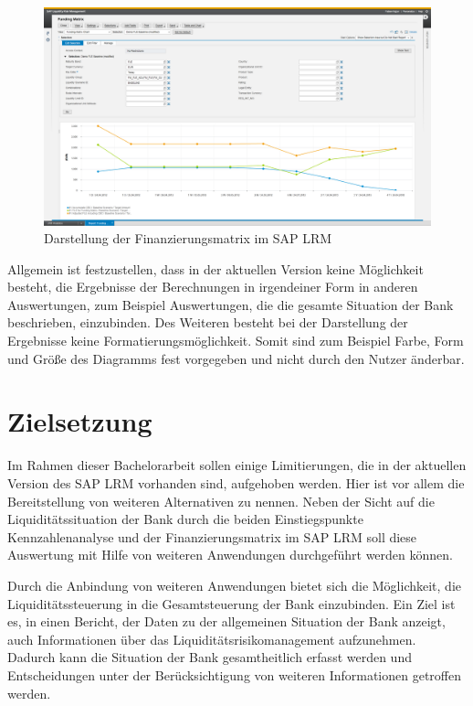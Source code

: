 \begin{onehalfspacing}
\begin{figure}[!ht]
\centering
\setlength{\unitlength}{1mm}
\includegraphics[width=15cm]{images/Funding_Matrix_Example.png}
\caption{Darstellung der Finanzierungsmatrix im SAP LRM\label{fig:lrm_istzustand_fundingmatrix}}
\end{figure} 

Allgemein ist festzustellen, dass in der aktuellen Version keine Möglichkeit besteht, die Ergebnisse der Berechnungen in irgendeiner Form in anderen Auswertungen, zum Beispiel Auswertungen, die die gesamte Situation der Bank beschrieben, einzubinden. Des Weiteren besteht bei der Darstellung der Ergebnisse keine Formatierungsmöglichkeit. Somit sind zum Beispiel Farbe, Form und Größe des Diagramms fest vorgegeben und nicht durch den Nutzer änderbar.

\section{Zielsetzung}
\label{sec:zielsetzung}

Im Rahmen dieser Bachelorarbeit sollen einige Limitierungen, die in der aktuellen Version des SAP LRM vorhanden sind, aufgehoben werden. Hier ist vor allem die Bereitstellung von weiteren Alternativen zu nennen. Neben der Sicht auf die Liquiditätssituation der Bank durch die beiden Einstiegspunkte Kennzahlenanalyse und der Finanzierungsmatrix im SAP LRM soll diese Auswertung mit Hilfe von weiteren Anwendungen durchgeführt werden können.

Durch die Anbindung von weiteren Anwendungen bietet sich die Möglichkeit, die  Liquiditätssteuerung in die Gesamtsteuerung der Bank einzubinden. Ein Ziel ist es, in einen Bericht, der Daten zu der allgemeinen Situation der Bank anzeigt, auch Informationen über das Liquiditätsrisikomanagement aufzunehmen. Dadurch kann die Situation der Bank gesamtheitlich erfasst werden und Entscheidungen unter der Berücksichtigung von weiteren Informationen getroffen werden.


\end{onehalfspacing}
